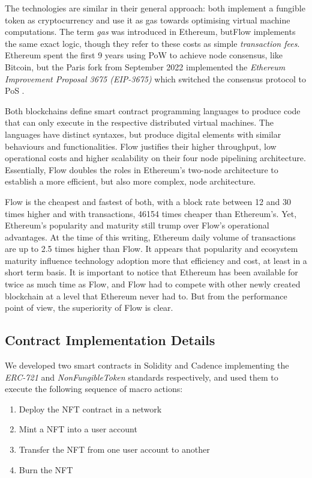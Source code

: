 \documentclass[../NFTComp_IEEE.tex]{subfiles}
\begin{document}
The technologies are similar in their general approach: both implement a fungible token as cryptocurrency and use it as gas towards optimising virtual machine computations. The term \textit{gas} was introduced in Ethereum, butFlow implements the same exact logic, though they refer to these costs as simple \textit{transaction fees}. Ethereum spent the first 9 years using PoW to achieve node consensus, like Bitcoin, but the Paris fork from September 2022 implemented the \textit{Ethereum Improvement Proposal 3675 (EIP-3675)} which switched the consensus protocol to PoS \cite{EIP3675}.
\par
Both blockchains define smart contract programming languages to produce code that can only execute in the respective distributed virtual machines. The languages have distinct syntaxes, but produce digital elements with similar behaviours and functionalities. Flow justifies their higher throughput, low operational costs and higher scalability on their four node pipelining architecture. Essentially, Flow doubles the roles in Ethereum's two-node architecture to establish a more efficient, but also more complex, node architecture.
\par
Flow is the cheapest and fastest of both, with a block rate between 12 and 30 times higher and with transactions, 46154 times cheaper than Ethereum's. Yet, Ethereum's popularity and maturity still trump over Flow's operational advantages. At the time of this writing, Ethereum daily volume of transactions are up to 2.5 times higher than Flow. It appears that popularity and ecosystem maturity influence technology adoption more that efficiency and cost, at least in a short term basis. It is important to notice that Ethereum has been available for twice as much time as Flow, and Flow had to compete with other newly created blockchain at a level that Ethereum never had to. But from the performance point of view, the superiority of Flow is clear.

\subsection{Contract Implementation Details}
We developed two smart contracts in Solidity and Cadence implementing the \textit{ERC-721} and \textit{NonFungibleToken} standards respectively, and used them to execute the following sequence of macro actions:
\begin{enumerate}
    \item {Deploy the NFT contract in a network}
    \item {Mint a NFT into a user account}
    \item {Transfer the NFT from one user account to another}
    \item {Burn the NFT}
\end{enumerate}
\end{document}
